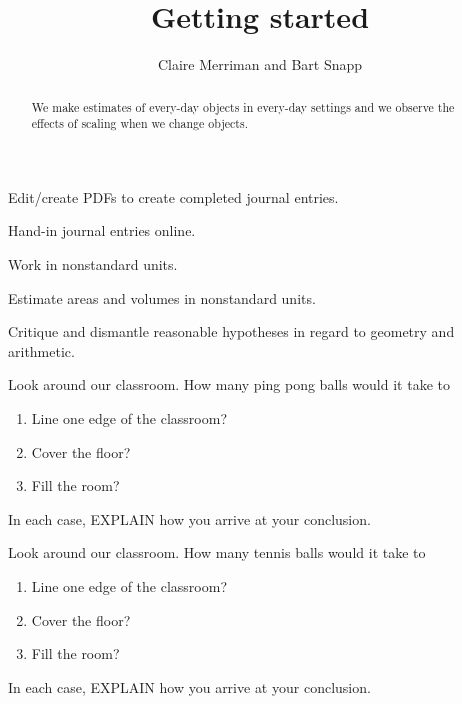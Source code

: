 \documentclass[handout,noauthor,nooutcomes,hints]{ximera}
\title{Getting started}
\author{Claire Merriman and Bart Snapp}
\begin{document}
\begin{abstract}
  We make estimates of every-day objects in every-day settings and we
  observe the effects of scaling when we change objects.
\end{abstract}
\maketitle



\begin{listOutcomes}
\item{Edit/create PDFs to create completed journal entries.}
\item{Hand-in journal entries online.}
\item{Work in nonstandard units.}
\item{Estimate areas and volumes in nonstandard units.}
\item{Critique and dismantle reasonable hypotheses in regard to geometry and arithmetic.}
\end{listOutcomes}

\mynewpage

\begin{question}
Look around our classroom. How many ping pong balls would it take to
\begin{enumerate}
\item Line one edge of the classroom?
\item Cover the floor?
\item Fill the room?
\end{enumerate}
In each case,  EXPLAIN how you arrive at your conclusion.



\end{question}
\mynewpage

\begin{question}
Look around our classroom. How many tennis balls would it take to
\begin{enumerate}
\item Line one edge of the classroom?
 \item Cover the floor?
 \item Fill the room?
\end{enumerate}
In each case, EXPLAIN how you arrive at your conclusion.
\end{question}
\end{document}

